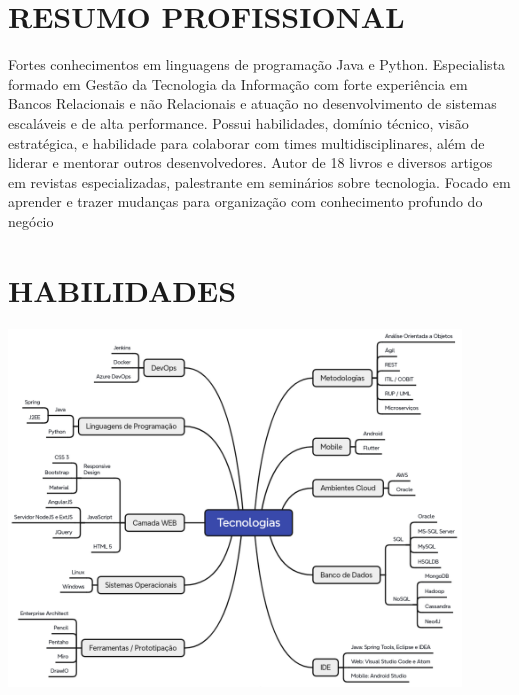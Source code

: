 \documentclass{res}
\begin{document}
	
	\thispagestyle{empty} %
	\address{{\bf Brasil - DF - Brasília} -- Jardim Botânico -- 71680-389 \\
		Tel. (61) 99874.0763 \\
	    fernando.anselmo74@gmail.com}
	
	\begin{resume}
		
		\section{RESUMO PROFISSIONAL}
		\vspace{8pt}
		Fortes conhecimentos em linguagens de programação Java e Python. Especialista formado em Gestão da Tecnologia da Informação com forte experiência em Bancos Relacionais e não Relacionais e atuação no desenvolvimento de sistemas escaláveis e de alta performance. Possui habilidades, domínio técnico, visão estratégica, e habilidade para colaborar com times multidisciplinares, além de liderar e mentorar outros desenvolvedores. Autor de 18 livros e diversos artigos em revistas especializadas, palestrante em seminários sobre tecnologia. Focado em aprender e trazer mudanças para organização com conhecimento profundo do negócio
		
		\section{HABILIDADES}
		\vspace{8pt}
		\includegraphics[width=0.9\textwidth]{imagens/tecnologias.png}
		

\end{resume}
\end{document}
